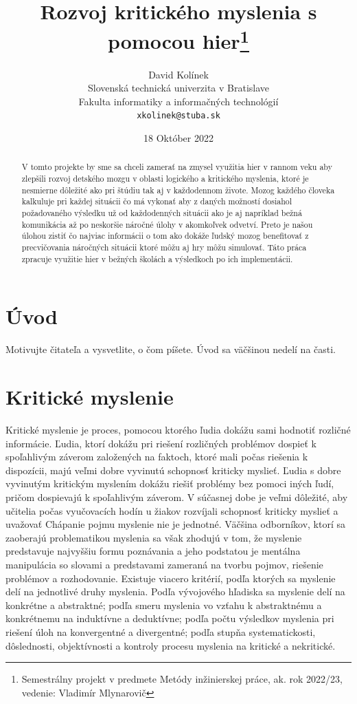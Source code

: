 \documentclass[10pt,oneside,slovak,a4paper]{article}
\title{Rozvoj kritického myslenia s pomocou hier\thanks{Semestrálny projekt v predmete Metódy inžinierskej práce, ak. rok 2022/23, vedenie: Vladimír Mlynarovič}} %
\author{David Kolínek\\[2pt]
	{\small Slovenská technická univerzita v Bratislave}\\
	{\small Fakulta informatiky a informačných technológií}\\
	{\small \texttt{xkolinek@stuba.sk}}
	}
\date{\small 18 Október 2022 } %
\begin{document}
\maketitle

\begin{abstract}
V tomto projekte by sme sa chceli zamerať na zmysel využitia hier v rannom veku aby zlepšili rozvoj 
detského mozgu v oblasti logického a kritického myslenia, ktoré je nesmierne dôležité ako pri štúdiu 
tak aj v každodennom živote. Mozog každého človeka kalkuluje pri každej situácii čo má vykonať aby 
z daných možností dosiahol požadovaného výsledku už od každodenných situácii ako je aj napríklad 
bežná komunikácia až po neskoršie náročné úlohy v akomkoľvek odvetví. Preto je našou úlohou zistiť 
čo najviac informácii o tom ako dokáže ľudský mozog benefitovať z precvičovania náročných situácii 
ktoré môžu aj hry môžu simulovať. Táto práca zpracuje využitie hier v bežných školách a výsledkoch po ich implementácii.
\end{abstract}



\section{Úvod}

Motivujte čitateľa a vysvetlite, o čom píšete. Úvod sa väčšinou nedelí na časti.

\section{Kritické myslenie}
Kritické myslenie je proces, pomocou ktorého ľudia dokážu sami hodnotiť rozličné
informácie. Ľudia, ktorí dokážu pri riešení rozličných problémov dospieť
k spoľahlivým záverom založených na faktoch, ktoré mali počas riešenia k dispozícii,
majú veľmi dobre vyvinutú schopnosť kriticky myslieť.
Ľudia s dobre vyvinutým kritickým myslením dokážu riešiť problémy bez pomoci
iných ľudí, pričom dospievajú k spoľahlivým záverom. V súčasnej dobe je veľmi
dôležité, aby učitelia počas vyučovacích hodín u žiakov rozvíjali schopnosť kriticky
myslieť a uvažovať Chápanie pojmu myslenie nie je jednotné. Väčšina odborníkov, ktorí sa zaoberajú
problematikou myslenia sa však zhodujú v tom, že myslenie predstavuje najvyššiu
formu poznávania a jeho podstatou je mentálna manipulácia so slovami
a predstavami zameraná na tvorbu pojmov, riešenie problémov a rozhodovanie.
Existuje viacero kritérií, podľa ktorých sa myslenie delí na jednotlivé druhy myslenia.
Podľa vývojového hľadiska sa myslenie delí na konkrétne a abstraktné; podľa smeru
myslenia vo vzťahu k abstraktnému a konkrétnemu na induktívne a deduktívne;
podľa počtu výsledkov myslenia pri riešení úloh na konvergentné a divergentné;
podľa stupňa systematickosti, dôslednosti, objektívnosti a kontroly procesu myslenia
na kritické a nekritické.
\end{document}
